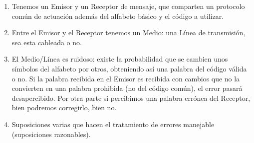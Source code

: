 \begin{enumerate}
\begin{enumerate}
    \begin{enumerate}
    \def\labelenumiii{\arabic{enumiii}.}
    \item
      Tenemos un Emisor y un Receptor de mensaje, que comparten un
      protocolo común de actuación además del alfabeto básico y el
      código a utilizar.
    \item
      Entre el Emisor y el Receptor tenemos un Medio: una Línea de
      transmisión, sea esta cableada o no.
    \item
      El Medio/Línea es ruidoso: existe la probabilidad que se cambien
      unos símbolos del alfabeto por otros, obteniendo así una palabra
      del código válida o no. Si la palabra re\-cibida en el Emisor es
      recibida con cambios que no la convierten en una palabra prohibida
      (no del código común), el error pasará desapercibido. Por otra
      parte si per\-cibimos una palabra errónea del Receptor, bien
      podremos corregirlo, bien no.
    \item
      Suposiciones varias que hacen el tratamiento de errores manejable
      (suposiciones ra\-zonables).


\end{enumerate}
\end{enumerate}
\end{enumerate}
